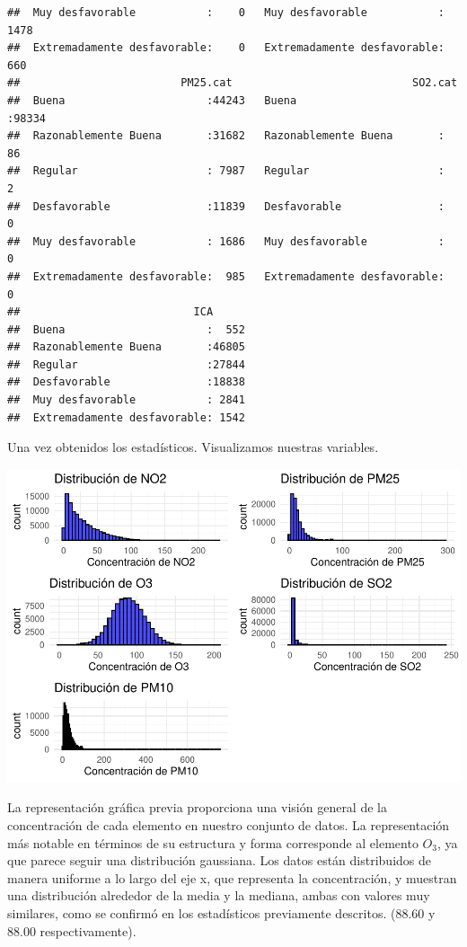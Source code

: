 \documentclass[notspecified,article,submit,moreauthors,pdftex]{Definitions/mdpi}
\begin{document}
\begin{verbatim}
##  Muy desfavorable           :    0   Muy desfavorable           : 1478  
##  Extremadamente desfavorable:    0   Extremadamente desfavorable:  660  
##                         PM25.cat                            SO2.cat     
##  Buena                      :44243   Buena                      :98334  
##  Razonablemente Buena       :31682   Razonablemente Buena       :   86  
##  Regular                    : 7987   Regular                    :    2  
##  Desfavorable               :11839   Desfavorable               :    0  
##  Muy desfavorable           : 1686   Muy desfavorable           :    0  
##  Extremadamente desfavorable:  985   Extremadamente desfavorable:    0  
##                           ICA       
##  Buena                      :  552  
##  Razonablemente Buena       :46805  
##  Regular                    :27844  
##  Desfavorable               :18838  
##  Muy desfavorable           : 2841  
##  Extremadamente desfavorable: 1542
\end{verbatim}

Una vez obtenidos los estadísticos. Visualizamos nuestras variables.

\includegraphics{ProyectoAED2023_files/figure-latex/unnamed-chunk-21-1.pdf}

La representación gráfica previa proporciona una visión general de la
concentración de cada elemento en nuestro conjunto de datos. La
representación más notable en términos de su estructura y forma
corresponde al elemento \(O_{3}\), ya que parece seguir una distribución
gaussiana. Los datos están distribuidos de manera uniforme a lo largo
del eje x, que representa la concentración, y muestran una distribución
alrededor de la media y la mediana, ambas con valores muy similares,
como se confirmó en los estadísticos previamente descritos. (88.60 y
88.00 respectivamente).
\end{document}
